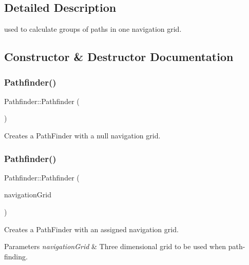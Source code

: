 \subsection{Detailed Description}
used to calculate groups of paths in one navigation grid. 



\subsection{Constructor \& Destructor Documentation}
\mbox{\label{class_pathfinder_af562d840858cf2b369fcee51f5069456}} 
\subsubsection{\texorpdfstring{Pathfinder()}{Pathfinder()}\hspace{0.1cm}{\footnotesize\ttfamily [1/2]}}
{\footnotesize\ttfamily Pathfinder\+::\+Pathfinder (\begin{DoxyParamCaption}{ }\end{DoxyParamCaption})}



Creates a Path\+Finder with a null navigation grid. 

\mbox{\label{class_pathfinder_ac1e4958b42424bbc9c5868cff3296e8c}} 
\subsubsection{\texorpdfstring{Pathfinder()}{Pathfinder()}\hspace{0.1cm}{\footnotesize\ttfamily [2/2]}}
{\footnotesize\ttfamily Pathfinder\+::\+Pathfinder (\begin{DoxyParamCaption}\item[{\hyperlink{class_array3_d}{Navigation\+Grid} $\ast$}]{navigation\+Grid }\end{DoxyParamCaption})\hspace{0.3cm}{\ttfamily [explicit]}}



Creates a Path\+Finder with an assigned navigation grid. 


\begin{DoxyParams}{Parameters}
{\em navigation\+Grid} & Three dimensional grid to be used when path-\/finding. \\
\hline
\end{DoxyParams}


